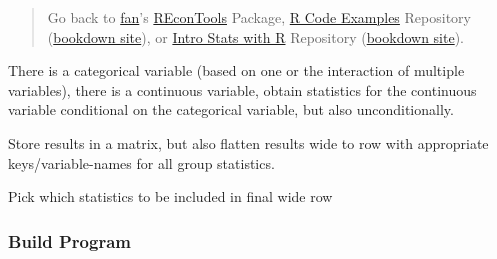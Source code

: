 \documentclass[
]{book}
\begin{document}
\begin{quote}
Go back to \href{http://fanwangecon.github.io/}{fan}'s \href{https://fanwangecon.github.io/REconTools/}{REconTools} Package, \href{https://fanwangecon.github.io/R4Econ/}{R Code Examples} Repository (\href{https://fanwangecon.github.io/R4Econ/bookdown}{bookdown site}), or \href{https://fanwangecon.github.io/Stat4Econ/}{Intro Stats with R} Repository (\href{https://fanwangecon.github.io/Stat4Econ/bookdown}{bookdown site}).
\end{quote}

There is a categorical variable (based on one or the interaction of multiple variables), there is a continuous variable, obtain statistics for the continuous variable conditional on the categorical variable, but also unconditionally.

Store results in a matrix, but also flatten results wide to row with appropriate keys/variable-names for all group statistics.

Pick which statistics to be included in final wide row

\hypertarget{build-program}{%
\subsubsection{Build Program}\label{build-program}}
\end{document}

